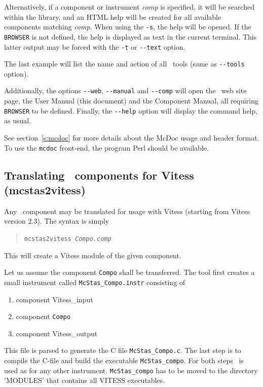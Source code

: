 Alternatively, if a component or instrument {\it comp} is specified, it will be searched within the library, and an HTML help will be created for all available components matching {\it comp}. When using the \verb+-s+, the help will be opened. If the \verb+BROWSER+ is not defined, the help is displayed as text in the current terminal. This latter output may be forced with the \verb+-t+ or \verb+--text+ option.

The last example will list the name and action of all \MCS\ tools (same as \verb+--tools+ option).

Additionally, the options \verb+--web+, \verb+--manual+ and \verb+--comp+ will open the \MCS\ web site page, the User Manual (this document) and the Component Manual, all requiring \verb+BROWSER+ to be defined. Finally, the \verb+--help+ option will display the command help, as usual.

See section~\ref{s:mcdoc} for more details about the McDoc usage and header format.
To use the \verb+mcdoc+ front-end, the program Perl should be available.

\subsection{Translating \MCS\ components for Vitess (mcstas2vitess)}
\label{s:mcstas2vitess}

Any \MCS\ component may be translated for usage with Vitess (starting from Vitess version 2.3). The syntax is simply 
\begin{quote}
  \texttt{mcstas2vitess {\it Compo.comp\/}}
\end{quote}
This will create a Vitess module of the given component.

Let us assume the component \verb+Compo+ shall be transferred. The tool first creates a small instrument called \verb+McStas_Compo.instr+ consisting of
\begin{enumerate}
\item component Vitess\_input
\item component \verb+Compo+
\item component Vitess\_output
\end{enumerate}

This file is parsed to generate the C file \verb+McStas_Compo.c+. The last step is to compile the C-file and build the executable \verb'McStas_compo'. For both steps \MCS\ is used as for any other instrument. \verb'McStas_compo' has to be moved to the directory 'MODULES' that contains all VITESS executables.

